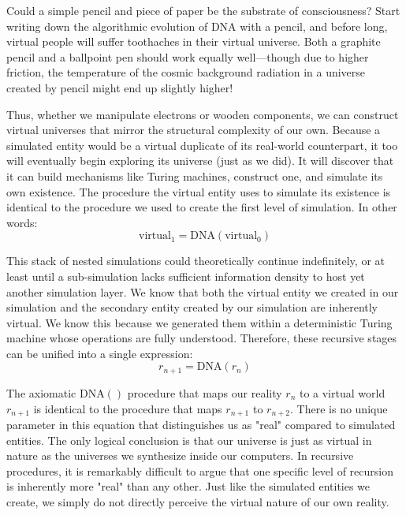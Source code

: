Could a simple pencil and piece of paper be the substrate of consciousness? Start writing down the algorithmic evolution of DNA with a pencil, and before long, virtual people will suffer toothaches in their virtual universe. Both a graphite pencil and a ballpoint pen should work equally well---though due to higher friction, the temperature of the cosmic background radiation in a universe created by pencil might end up slightly higher!

Thus, whether we manipulate electrons or wooden components, we can construct virtual universes that mirror the structural complexity of our own. Because a simulated entity would be a virtual duplicate of its real-world counterpart, it too will eventually begin exploring its universe (just as we did). It will discover that it can build mechanisms like Turing machines, construct one, and simulate its own existence. The procedure the virtual entity uses to simulate its existence is identical to the procedure we used to create the first level of simulation. In other words:
\begin{equation*}
  \text{virtual}_1 = \text{DNA}(\text{virtual}_0)
\end{equation*}

This stack of nested simulations could theoretically continue indefinitely, or at least until a sub-simulation lacks sufficient information density to host yet another simulation layer. We know that both the virtual entity we created in our simulation and the secondary entity created by our simulation are inherently virtual. We know this because we generated them within a deterministic Turing machine whose operations are fully understood. Therefore, these recursive stages can be unified into a single expression:
\begin{equation*}
  r_{n+1} = \text{DNA}(r_n)
\end{equation*}

The axiomatic $\text{DNA}()$ procedure that maps our reality $r_n$ to a virtual world $r_{n+1}$ is identical to the procedure that maps $r_{n+1}$ to $r_{n+2}$. There is no unique parameter in this equation that distinguishes us as "real" compared to simulated entities. The only logical conclusion is that our universe is just as virtual in nature as the universes we synthesize inside our computers. In recursive procedures, it is remarkably difficult to argue that one specific level of recursion is inherently more "real" than any other. Just like the simulated entities we create, we simply do not directly perceive the virtual nature of our own reality.

